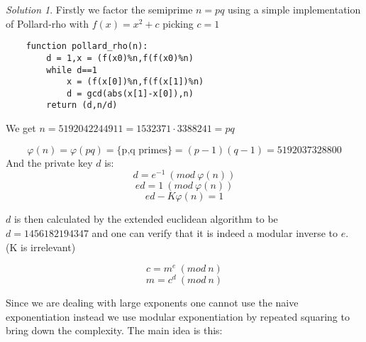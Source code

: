\documentclass[a4paper,twoside=false,abstract=false,numbers=noenddot,
titlepage=false,headings=small,parskip=half,version=last]{scrartcl}
\theoremstyle{definition}
\theoremstyle{remark}
\newtheorem*{solution}{Solution}
\begin{document}
\begin{solution}
Firstly we factor the semiprime $n=pq$ using a simple implementation of
Pollard-rho with $f(x)=x^2+c$ picking $c=1$

\begin{verbatim}
    function pollard_rho(n):
        d = 1,x = (f(x0)%n,f(f(x0)%n)
        while d==1
            x = (f(x[0])%n,f(f(x[1])%n)
            d = gcd(abs(x[1]-x[0]),n)
        return (d,n/d)
\end{verbatim}

We get $n=5192042244911=1532371 \cdot 3388241 = pq$

\begin{equation*}
    \varphi(n)=\varphi(pq)=\{\mbox{p,q primes}\}=(p-1)(q-1) = 5192037328800
\end{equation*}
And the private key $d$ is:
\begin{equation*}
    d=e^{-1} \ (mod \ \varphi(n))
\end{equation*}
\begin{equation*}
    ed=1 \ (mod \ \varphi(n))
\end{equation*}
\begin{equation*}
    ed - K\varphi(n)=1
\end{equation*}

$d$ is then calculated by the extended euclidean algorithm to be
\underline{$d=1456182194347$} and one can verify that it is indeed a modular inverse to
$e$. (K is irrelevant)

\begin{equation} \label{eq:encrypt}
    c=m^e \ (mod \ n)
\end{equation}
\begin{equation} \label{eq:decrypt}
    m=c^d \ (mod \ n)
\end{equation}

Since we are dealing with large exponents one cannot use the naive exponentiation 
instead we use modular exponentiation by repeated squaring to bring down the
complexity. The main idea is this:



\end{solution}
\end{document}
